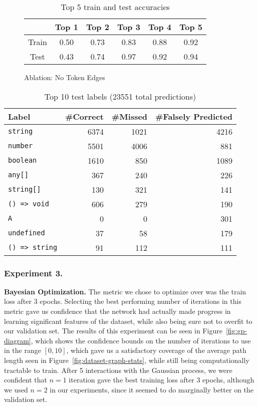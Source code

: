 \begin{table}
  \medskip

  \begin{subfigure}{\linewidth}
    \centering
    \begin{tabular}{c|ccccc}
      & \textbf{Top 1} & \textbf{Top 2} & \textbf{Top 3} & \textbf{Top 4} & \textbf{Top 5} \\
      \hline
      Train & 0.50 & 0.73 & 0.83 & 0.88 & 0.92 \\
      Test & 0.43 & 0.74 & 0.97 & 0.92 & 0.94
      \end{tabular}
      \caption{Ablation: No Token Edges}\label{tab:results:token}
  \end{subfigure}
  \caption{Top 5 train and test accuracies}
  \label{tab:results}
\end{table}

\begin{table}
  \centering
  \begin{tabular}{lrrr}
    \textbf{Label} & \textbf{\#Correct} & \textbf{\#Missed} & \textbf{\#Falsely Predicted} \\
    \hline
    \texttt{string} & 6374 & 1021 & 4216 \\
    \texttt{number} & 5501 & 4006 & 881 \\
    \texttt{boolean} & 1610 & 850 & 1089 \\
    \texttt{any[]} & 367 & 240 & 226 \\
    \texttt{string[]} & 130 & 321 & 141 \\
    \texttt{() => void} & 606 & 279 & 190 \\
    \texttt{A}  & 0 & 0 & 301 \\
    \texttt{undefined} & 37 & 58 & 179 \\
    \texttt{() => string} & 91 & 112 & 111
  \end{tabular}
  \caption{Top 10 test labels (23551 total predictions)}\label{tab:test-fps}
\end{table}

\subsubsection{Experiment 3.}
\textbf{Bayesian Optimization.}
The metric we chose to optimize over was the train loss after 3 epochs.
Selecting the best performing number of iterations in this metric gave us confidence that the network had actually made progress in learning significant features of the dataset, while also being sure not to overfit to our validation set.
The results of this experiment can be seen in Figure~\ref{fig:gp-diagram}, which shows the confidence bounds on the number of iterations to use in the range $[0, 10]$, which gave us a satisfactory coverage of the average path length seen in Figure~\ref{fig:dataset-graph-stats}, while still being computationally tractable to train.
After 5 interactions with the Gaussian process, we were confident that $n=1$ iteration gave the best training loss after 3 epochs, although we used $n=2$ in our experiments, since it seemed to do marginally better on the validation set.

